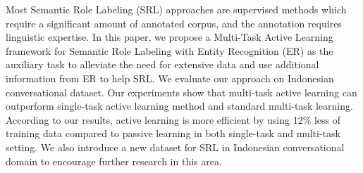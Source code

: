 Most Semantic Role Labeling (SRL) approaches are supervised methods which require a significant amount of annotated corpus, and the annotation requires linguistic expertise. In this paper, we propose a Multi-Task Active Learning framework for Semantic Role Labeling with Entity Recognition (ER) as the auxiliary task to alleviate the need for extensive data and use additional information from ER to help SRL. We evaluate our approach on Indonesian conversational dataset. Our experiments show that multi-task active learning can outperform single-task active learning method and standard multi-task learning. According to our results, active learning is more efficient by using 12\% less of training data compared to passive learning in both single-task and multi-task setting. We also introduce a new dataset for SRL in Indonesian conversational domain to encourage further research in this area.
